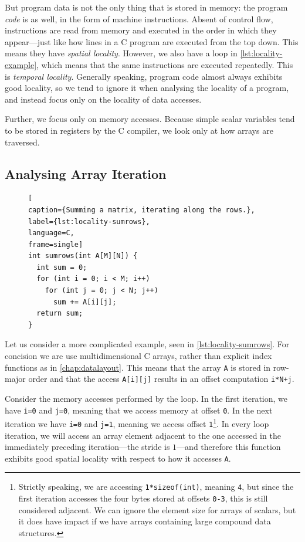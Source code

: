 But program data is not the only thing that is stored in memory: the
program \emph{code} is as well, in the form of machine instructions.
Absent of control flow, instructions are read from memory and executed
in the order in which they appear---just like how lines in a C program
are executed from the top down.  This means they have \emph{spatial
  locality}.  However, we also have a loop in
\cref{lst:locality-example}, which means that the same instructions
are executed repeatedly.  This is \emph{temporal locality}.  Generally
speaking, program code almost always exhibits good locality, so we
tend to ignore it when analysing the locality of a program, and
instead focus only on the locality of data accesses.

Further, we focus only on memory accesses.  Because simple scalar
variables tend to be stored in registers by the C compiler, we look
only at how arrays are traversed.

\subsection{Analysing Array Iteration}

\begin{figure}
\begin{lstlisting}[
caption={Summing a matrix, iterating along the rows.},
label={lst:locality-sumrows},
language=C,
frame=single]
int sumrows(int A[M][N]) {
  int sum = 0;
  for (int i = 0; i < M; i++)
    for (int j = 0; j < N; j++)
      sum += A[i][j];
  return sum;
}
\end{lstlisting}
\end{figure}

Let us consider a more complicated example, seen in
\cref{lst:locality-sumrows}.  For concision we are use
multidimensional C arrays, rather than explicit index functions as in
\cref{chap:datalayout}.  This means that the array \texttt{A} is
stored in row-major order and that the access \texttt{A[i][j]} results
in an offset computation \texttt{i*N+j}.

Consider the memory accesses performed by the loop.  In the first
iteration, we have \texttt{i=0} and \texttt{j=0}, meaning that we
access memory at offset \texttt{0}.  In the next iteration we have
\texttt{i=0} and \texttt{j=1}, meaning we access offset
\texttt{1}\footnote{Strictly speaking, we are accessing
  \texttt{1*sizeof(int)}, meaning \texttt{4}, but since the first
  iteration accesses the four bytes stored at offsets \texttt{0-3},
  this is still considered adjacent.  We can ignore the element size
  for arrays of scalars, but it does have impact if we have arrays
  containing large compound data structures.}.  In every loop
iteration, we will access an array element adjacent to the one
accessed in the immediately preceding iteration---the stride is
$1$---and therefore this function exhibits good spatial locality with
respect to how it accesses \texttt{A}.

